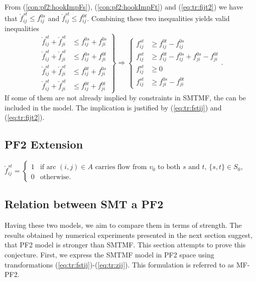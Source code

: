From (\ref{con:pf2:hookImpFs}), (\ref{con:pf2:hookImpFt}) and (\ref{eq:tr:fijt2}) we have that $\check{f}^{st}_{ij}\leq f^{0s}_{ij}$ and $\check{f}^{st}_{ij}\leq f^{0t}_{ij}$. Combining these two inequalities yields valid inequalities
\[
\left.
\begin{array}{ll}
\check{f}^{st}_{ij}+\check{f}^{st}_{ji}&\leq f^{0s}_{ij}+f^{0s}_{ji} \\[.2cm]
\check{f}^{st}_{ij}+\check{f}^{st}_{ji}&\leq f^{0s}_{ij}+f^{0t}_{ji} \\[.2cm]
\check{f}^{st}_{ij}+\check{f}^{st}_{ji}&\leq f^{0t}_{ij}+f^{0s}_{ji} \\[.2cm]
\check{f}^{st}_{ij}+\check{f}^{st}_{ji}&\leq f^{0t}_{ij}+f^{0t}_{ji} 
\end{array}
\right\} \Rightarrow
\left\{
\begin{array}{ll}
f^{st}_{ij}&\geq f^{0t}_{ij}-f^{0s}_{ij} \\[.2cm]
f^{st}_{ij}&\geq f^{0t}_{ij}-f^{0s}_{ij} + f^{0s}_{ji} - f^{0t}_{ji} \\[.2cm]
f^{st}_{ij}&\geq 0 \\[.2cm]
f^{st}_{ij}&\geq f^{0s}_{ji}-f^{0t}_{ji}
\end{array}.
\right.
\]
If some of them are not already implied by constraints in SMTMF, the can be included in the model. The implication is justified by (\ref{eq:tr:fstij}) and (\ref{eq:tr:fijt2}).
 
\subsection{PF2 Extension}
  $\check{f}^{st}_{ij}=
	\begin{cases}
    1 & \text{if arc $(i,j) \in A$ carries flow from $v_0$ to both $s$ and $t$, $\{s,t\}\in S_0$},\\
    0 & \text{otherwise}.
  \end{cases}$
 
\subsection{Relation between SMT a PF2}

Having these two models, we aim to compare them in terms of strength. The results obtained by numerical experiments presented in the next section suggest, that PF2 model is stronger than SMTMF. This section attempts to prove this conjecture. First, we express the SMTMF model in PF2 space using transformations (\ref{eq:tr:fstij})-(\ref{eq:tr:zij}). This formulation is referred to as MF-PF2.

